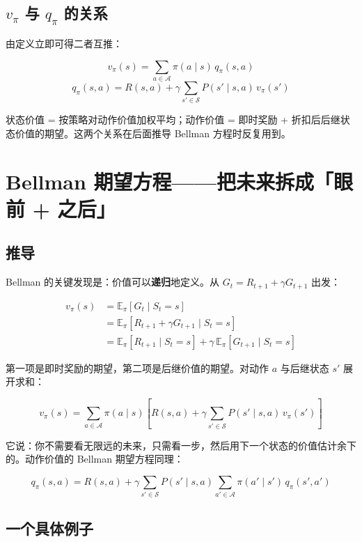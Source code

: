 \documentclass{article}
\begin{document}
\subsection*{$v_\pi$ 与 $q_\pi$ 的关系}

由定义立即可得二者互推：

\[
v_\pi(s) = \sum_{a\in\mathcal{A}} \pi(a\mid s)\, q_\pi(s,a)
\]
\[
q_\pi(s,a) = R(s,a) + \gamma \sum_{s'\in\mathcal{S}} P(s'\mid s,a)\, v_\pi(s')
\]

状态价值 = 按策略对动作价值加权平均；动作价值 = 即时奖励 + 折扣后后继状态价值的期望。这两个关系在后面推导 Bellman 方程时反复用到。

\section*{Bellman 期望方程——把未来拆成「眼前 + 之后」}

\subsection*{推导}

Bellman 的关键发现是：价值可以\textbf{递归}地定义。从 $G_t = R_{t+1} + \gamma G_{t+1}$ 出发：

\[
\begin{aligned}
v_\pi(s) &= \mathbb{E}_\pi[G_t \mid S_t=s] \\
&= \mathbb{E}_\pi[R_{t+1} + \gamma G_{t+1} \mid S_t=s] \\
&= \mathbb{E}_\pi[R_{t+1}\mid S_t=s] + \gamma\,\mathbb{E}_\pi[G_{t+1}\mid S_t=s]
\end{aligned}
\]

第一项是即时奖励的期望，第二项是后继价值的期望。对动作 $a$ 与后继状态 $s'$ 展开求和：

\[
\boxed{v_\pi(s) = \sum_{a\in\mathcal{A}} \pi(a\mid s) \left[ R(s,a) + \gamma \sum_{s'\in\mathcal{S}} P(s'\mid s,a)\, v_\pi(s') \right]}
\]

它说：你不需要看无限远的未来，只需看一步，然后用下一个状态的价值估计余下的。动作价值的 Bellman 期望方程同理：

\[
q_\pi(s,a) = R(s,a) + \gamma \sum_{s'\in\mathcal{S}} P(s'\mid s,a) \sum_{a'\in\mathcal{A}} \pi(a'\mid s')\, q_\pi(s',a')
\]

\subsection*{一个具体例子}
\end{document}
